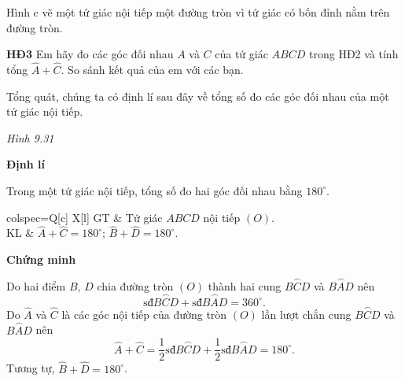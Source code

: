 \begin{lesson}
    Hình c vẽ một tứ giác nội tiếp một đường tròn vì tứ giác có bốn đỉnh nằm trên đường tròn.

    \textbf{HĐ3} Em hãy đo các góc đối nhau $A$ và $C$ của tứ giác $ABCD$ trong HĐ2 và tính tổng $\widehat A+\widehat C$. So sánh kết quả của em với các bạn.

    \answerline

    Tổng quát, chúng ta có định lí sau đây về tổng số đo các góc đối nhau của một tứ giác nội tiếp.

    \begin{center}

        \textit{Hình 9.31}
    \end{center}

    \textbf{Định lí}

    \begin{keyconcept}
        Trong một tứ giác nội tiếp, tổng số đo hai góc đối nhau bằng $180^\circ$.
    \end{keyconcept}

    \begin{center}
    \begin{tblr}{colspec={Q[c] X[l]}}
        GT & Tứ giác $ABCD$ nội tiếp $(O)$. \\
        KL & $\widehat A+\widehat C=180^\circ$; $\widehat B+\widehat D=180^\circ$. \\
    \end{tblr}
    \end{center}

    \textbf{Chứng minh}

    Do hai điểm $B$, $D$ chia đường tròn $(O)$ thành hai cung $\overset{\frown}{BCD}$ và $\overset{\frown}{BAD}$ nên
    \[
        \text{sđ}\overset{\frown}{BCD}+\text{sđ}\overset{\frown}{BAD}=360^\circ.
    \]
    Do $\widehat A$ và $\widehat C$ là các góc nội tiếp của đường tròn $(O)$ lần lượt chắn cung $\overset{\frown}{BCD}$ và $\overset{\frown}{BAD}$ nên
    \[
        \widehat A+\widehat C
        =\dfrac12\text{sđ}\overset{\frown}{BCD}
        +\dfrac12\text{sđ}\overset{\frown}{BAD}
        =180^\circ.
    \]
    Tương tự, $\widehat B+\widehat D=180^\circ$.


\end{lesson}
